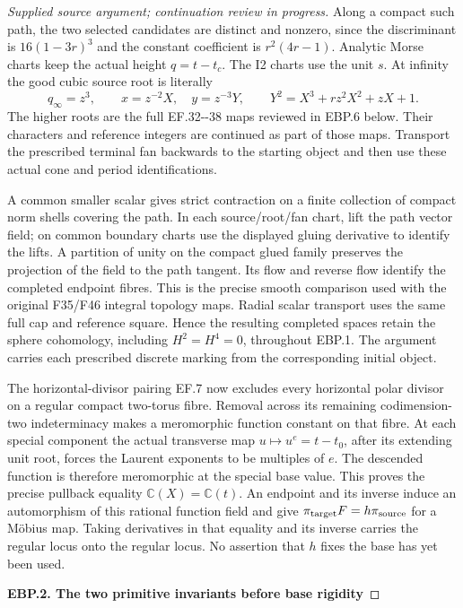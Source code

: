 \begin{proof}[Supplied source argument; continuation review in progress]
Along a compact such path, the two selected candidates are distinct and
nonzero, since the discriminant is \(16(1-3r)^3\) and the constant
coefficient is \(r^2(4r-1)\). Analytic Morse charts keep the actual
height \(q=t-t_c\). The I2 charts use the unit \(s\). At infinity the
good cubic source root is literally
\[
 q_\infty=z^3,\qquad x=z^{-2}X,
 \quad y=z^{-3}Y,\qquad
 Y^2=X^3+rz^2X^2+zX+1.
 \tag{EBP.4}
\]
The higher roots are the full EF.32-\/-38 maps reviewed in EBP.6 below.
Their characters and reference integers are continued as part of those
maps. Transport the prescribed terminal fan backwards to the starting
object and then use these actual cone and period identifications.

A common smaller scalar gives strict contraction on a finite collection
of compact norm shells covering the path. In each source/root/fan chart,
lift the path vector field; on common boundary charts use the displayed
gluing derivative to identify the lifts. A partition of unity on the
compact glued family preserves the projection of the field to the path
tangent. Its flow and reverse flow identify the completed endpoint
fibres. This is the precise smooth comparison used with the original
F35/F46 integral topology maps. Radial scalar transport uses the same
full cap and reference square. Hence the resulting completed spaces
retain the sphere cohomology, including \(H^2=H^4=0\), throughout
EBP.1. The argument carries each prescribed discrete marking from the
corresponding initial object.

The horizontal-divisor pairing EF.7 now excludes every horizontal polar
divisor on a regular compact two-torus fibre. Removal across its remaining
codimension-two indeterminacy makes a meromorphic function constant on
that fibre. At each special component the actual transverse map
\(u\mapsto u^e=t-t_0\), after its extending unit root, forces the
Laurent exponents to be multiples of \(e\). The descended function is
therefore meromorphic at the special base value. This proves the precise
pullback equality \(\mathbb C(X)=\mathbb C(t)\). An endpoint and its
inverse induce an automorphism of this rational function field and give
\(\pi_{\rm target}F=h\pi_{\rm source}\) for a Möbius map. Taking
derivatives in that equality and its inverse carries the regular locus
onto the regular locus. No assertion that \(h\) fixes the base has yet
been used.

\par

\medskip\noindent\textbf{EBP.2. The two primitive invariants before base rigidity}


\end{proof}
